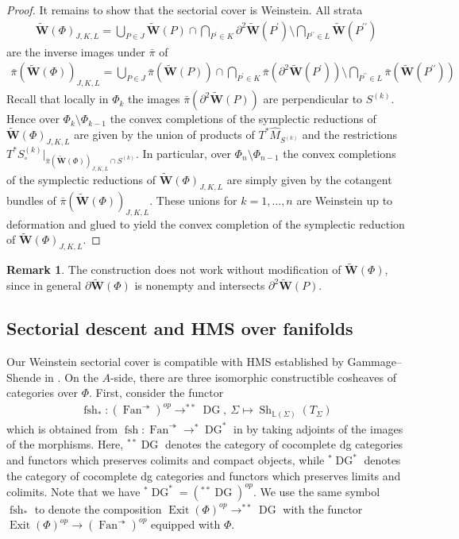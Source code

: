 \documentclass[a4paper,12pt, twoside, pdftex]{amsart}
\theoremstyle{definition}
\newtheorem{remark}[dummy]{Remark}
\numberwithin{equation}{section}
\newcommand{\del}{\partial}
\newcommand{\DG}{\operatorname{DG}}
\newcommand{\Exit}{\operatorname{Exit}}
\newcommand{\Fan}{\operatorname{Fan}}
\newcommand{\fsh}{\operatorname{fsh}}
\newcommand{\Sh}{\operatorname{Sh}}
\newcommand{\bL}{\mathbb{L}}
\newcommand{\bfW}{\mathbf{W}}
\begin{document}
\begin{proof}
It remains to show that
the sectorial cover is Weinstein.
All strata
\begin{align*}
\widetilde{\bfW}(\Phi)_{J, K, L}
=
\bigcup_{P \in J} \widetilde{\bfW}(P)
\cap
\bigcap_{P^\prime \in K} \del^2 \widetilde{\bfW}(P^\prime)
\setminus
\bigcap_{P^{\prime \prime} \in L} \widetilde{\bfW}(P^{\prime \prime})
\end{align*}
are the inverse images under
$\bar{\pi}$
of
\begin{align*}
\bar{\pi}(\widetilde{\bfW}(\Phi))_{J, K, L}
=
\bigcup_{P \in J} \bar{\pi}(\widetilde{\bfW}(P))
\cap
\bigcap_{P^\prime \in K} \bar{\pi}(\del^2 \widetilde{\bfW}(P^\prime))
\setminus
\bigcap_{P^{\prime \prime} \in L} \bar{\pi}(\widetilde{\bfW}(P^{\prime \prime}))
\end{align*}
Recall that
locally in
$\Phi_k$
the images
$\bar{\pi}(\del^2 \widetilde{\bfW}(P))$
are perpendicular to
$S^{(k)}$.
Hence over
$\Phi_k \setminus \Phi_{k-1}$
the convex completions of the symplectic reductions of
$\widetilde{\bfW}(\Phi)_{J, K, L}$
are given by the union of products of
$T^* \widehat{M}_{S^{(k)}}$
and
the restrictions
$T^* S^{(k)}_\circ |_{\bar{\pi}(\widetilde{\bfW}(\Phi))_{J, K, L} \cap S^{(k)}}$.
In particular,
over
$\Phi_n \setminus \Phi_{n-1}$
the convex completions of the symplectic reductions of
$\widetilde{\bfW}(\Phi)_{J, K, L}$
are simply given by the cotangent bundles of
$\bar{\pi}(\widetilde{\bfW}(\Phi))_{J, K, L}$.
These unions for
$k = 1, \ldots, n$
are
Weinstein up to deformation
and
glued to yield the convex completion of the symplectic reduction of
$\widetilde{\bfW}(\Phi)_{J, K, L}$.
\end{proof}

\begin{remark}
The construction does not work without modification of
$\widetilde{\bfW}(\Phi)$,
since in general
$\del \widetilde{\bfW}(\Phi)$
is nonempty
and
intersects
$\del^2 \widetilde{\bfW}(P)$.
\end{remark}

\subsection{Sectorial descent and HMS over fanifolds}
Our Weinstein sectorial cover is compatible with HMS established by Gammage--Shende in
\cite{GS1}.
On the $A$-side,
there are three isomorphic constructible cosheaves of categories over
$\Phi$.
First,
consider the functor
\begin{align*}
\fsh_*
\colon
(\Fan^\twoheadrightarrow)^{op}
\to
^{**} \DG, \
\Sigma
\mapsto
\Sh_{\bL(\Sigma)}(T_\Sigma)
\end{align*}
which is obtained from
$\fsh
\colon
\Fan^\twoheadrightarrow
\to
^{*} \DG^*$
in
\cite[Section 4.5]{GS1}
by taking adjoints of the images of the morphisms.
Here,
$^{**} \DG$
denotes the category of
cocomplete dg categories
and
functors
which preserves
colimits
and
compact objects,
while
$^{*} \DG^*$
denotes the category of
cocomplete dg categories
and
functors
which preserves 
limits
and
colimits.
Note that
we have
$^{*} \DG^* = (^{**} \DG)^{op}$.
We use the same symbol
$\fsh_*$
to denote the composition
$\Exit(\Phi)^{op}
\to
^{**} \DG$
with the functor
$\Exit(\Phi)^{op}
\to
(\Fan^\twoheadrightarrow)^{op}$
equipped with
$\Phi$.
\end{document}

